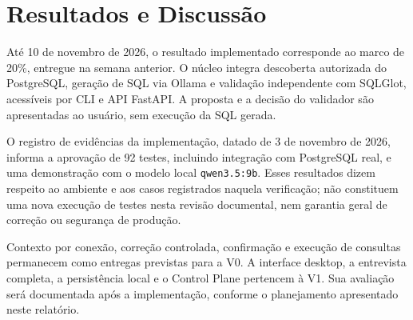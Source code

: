 \chapter{Resultados e Discussão}
\label{cap:03}

Até 10 de novembro de 2026, o resultado implementado corresponde ao marco de 20\%, entregue na semana anterior. O núcleo integra descoberta autorizada do PostgreSQL, geração de SQL via Ollama e validação independente com SQLGlot, acessíveis por CLI e API FastAPI. A proposta e a decisão do validador são apresentadas ao usuário, sem execução da SQL gerada.

O registro de evidências da implementação, datado de 3 de novembro de 2026, informa a aprovação de 92 testes, incluindo integração com PostgreSQL real, e uma demonstração com o modelo local \texttt{qwen3.5:9b}. Esses resultados dizem respeito ao ambiente e aos casos registrados naquela verificação; não constituem uma nova execução de testes nesta revisão documental, nem garantia geral de correção ou segurança de produção.

Contexto por conexão, correção controlada, confirmação e execução de consultas permanecem como entregas previstas para a V0. A interface desktop, a entrevista completa, a persistência local e o Control Plane pertencem à V1. Sua avaliação será documentada após a implementação, conforme o planejamento apresentado neste relatório.

